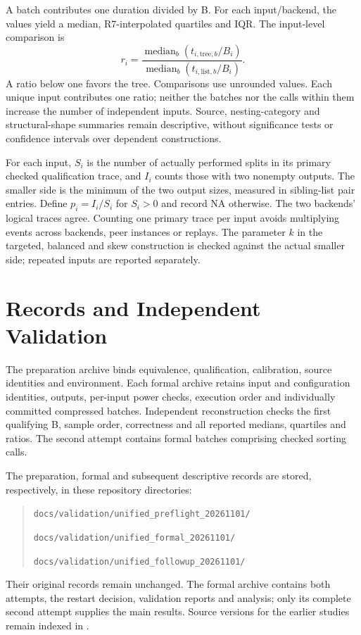 A batch contributes one duration divided by B. For each input/backend, the
\UnifiedRounds{} values yield a median, R7-interpolated quartiles and IQR.
The input-level comparison is
\[
 r_i=\frac{\operatorname{median}_{b}(t_{i,\mathrm{tree},b}/B_i)}
 {\operatorname{median}_{b}(t_{i,\mathrm{list},b}/B_i)}.
\]
A ratio below one favors the tree. Comparisons use unrounded values. Each
unique input contributes one ratio; neither the batches nor the calls within
them increase the number of independent inputs. Source, nesting-category and
structural-shape summaries remain descriptive, without significance tests or
confidence intervals over dependent constructions.

For each input, $S_i$ is the number of actually performed splits in its
primary checked qualification trace, and $I_i$ counts those with two nonempty
outputs. The smaller side is the minimum of the two output sizes, measured
in sibling-list pair entries. Define $p_i=I_i/S_i$ for $S_i>0$ and record NA
otherwise. The two backends' logical traces agree. Counting one primary trace
per input avoids multiplying events across backends, peer instances or replays.
The parameter $k$ in the targeted, balanced and skew construction is checked
against the actual smaller side; repeated inputs are reported separately.

\section{Records and Independent Validation}
\label{sec:method-evidence}
\label{sec:method-validation}
\label{sec:method-boundaries}

The preparation archive binds equivalence, qualification, calibration,
source identities and environment. Each formal archive retains input and
configuration identities, outputs, per-input power checks, execution order and
individually committed compressed batches. Independent reconstruction checks
the first qualifying B, sample order, correctness and all reported medians,
quartiles and ratios. The second attempt contains \UnifiedBatches{} formal
batches comprising \UnifiedCalls{} checked sorting calls.

The preparation, formal and subsequent descriptive records are stored,
respectively, in these repository directories:
\begin{quote}\small
\nolinkurl{docs/validation/unified_preflight_20261101/}\par
\nolinkurl{docs/validation/unified_formal_20261101/}\par
\nolinkurl{docs/validation/unified_followup_20261101/}
\end{quote}
Their original records remain unchanged. The formal archive contains both attempts, the restart
decision, validation reports and analysis; only its complete second attempt
supplies the main results. Source versions for the earlier studies remain
indexed in .

